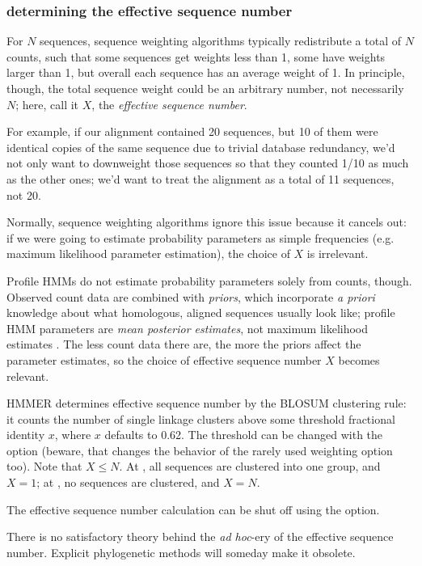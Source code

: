 \subsubsection{determining the effective sequence number}

For $N$ sequences, sequence weighting algorithms typically
redistribute a total of $N$ counts, such that some sequences get
weights less than 1, some have weights larger than 1, but overall each
sequence has an average weight of 1. In principle, though, the total
sequence weight could be an arbitrary number, not necessarily $N$;
here, call it $X$, the \emph{effective sequence number}. 

For example, if our alignment contained 20 sequences, but 10 of them
were identical copies of the same sequence due to trivial database
redundancy, we'd not only want to downweight those sequences so that
they counted 1/10 as much as the other ones; we'd want to treat the
alignment as a total of 11 sequences, not 20.

Normally, sequence weighting algorithms ignore this issue because it
cancels out: if we were going to estimate probability parameters as
simple frequencies (e.g. maximum likelihood parameter estimation), the
choice of $X$ is irrelevant.

Profile HMMs do not estimate probability parameters solely from
counts, though. Observed count data are combined with \emph{priors},
which incorporate \emph{a priori} knowledge about what homologous,
aligned sequences usually look like; profile HMM parameters are
\emph{mean posterior estimates}, not maximum likelihood estimates
\citep{Durbin98,Sjolander96}. The less count data there are, the more
the priors affect the parameter estimates, so the choice of effective
sequence number $X$ becomes relevant.

HMMER determines effective sequence number by the BLOSUM clustering
rule: it counts the number of single linkage clusters above some
threshold fractional identity $x$, where $x$ defaults to 0.62.  The
threshold can be changed with the  option (beware,
that changes the behavior of the rarely used 
weighting option too). Note that $X \leq N$. At ,
all sequences are clustered into one group, and $X=1$; at
, no sequences are clustered, and $X=N$.

The effective sequence number calculation can be shut off using the
 option.

There is no satisfactory theory behind the \emph{ad hoc}-ery of the
effective sequence number. Explicit phylogenetic methods will someday
make it obsolete.

